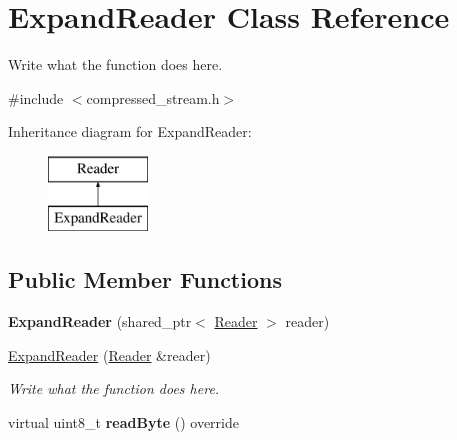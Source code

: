 \hypertarget{classExpandReader}{\section{Expand\+Reader Class Reference}
\label{classExpandReader}
}


Write what the function does here.  




{\ttfamily \#include $<$compressed\+\_\+stream.\+h$>$}

Inheritance diagram for Expand\+Reader\+:\begin{figure}[H]
\begin{center}
\leavevmode
\includegraphics[height=2.000000cm]{classExpandReader}
\end{center}
\end{figure}
\subsection*{Public Member Functions}
\begin{DoxyCompactItemize}
\item 
\hypertarget{classExpandReader_a6e08c2a0ddfcaf4039364a7d5b86c713}{{\bfseries Expand\+Reader} (shared\+\_\+ptr$<$ \hyperlink{classReader}{Reader} $>$ reader)}\label{classExpandReader_a6e08c2a0ddfcaf4039364a7d5b86c713}

\item 
\hyperlink{classExpandReader_acff92ec084cb738b0a072fcad2096e45}{Expand\+Reader} (\hyperlink{classReader}{Reader} \&reader)
\begin{DoxyCompactList}\small\item\em Write what the function does here. \end{DoxyCompactList}\item 
\hypertarget{classExpandReader_ad3339a664afce44dbba5ceb3cf9b6ebd}{virtual uint8\+\_\+t {\bfseries read\+Byte} () override}\label{classExpandReader_ad3339a664afce44dbba5ceb3cf9b6ebd}

\end{DoxyCompactItemize}

